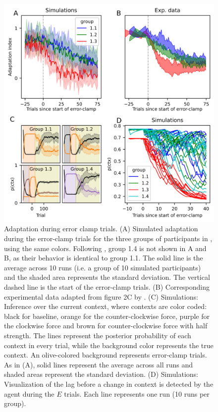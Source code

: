\documentclass[a4paper,doc,floatsintext,natbib]{apa6}
\begin{document}
\begin{figure}
\centering
\includegraphics[width=\textwidth]{./figures/figure_4.png}
\caption{Adaptation during error clamp trials. (A) Simulated adaptation during the error-clamp trials for the three groups of participants in \cite{Vaswani_Decay_2013}, using the same colors. Following \cite{Vaswani_Decay_2013}, group 1.4 is not shown in A and B, as their behavior is identical to group 1.1. The solid line is the average across 10 runs (i.e. a group of 10 simulated participants) and the shaded area represents the standard deviation. The vertical dashed line is the start of the error-clamp trials. (B) Corresponding experimental data adapted from figure 2C by \cite{Vaswani_Decay_2013}. (C) Simulations: Inference over the current context, where contexts are color coded: black for baseline, orange for the counter-clockwise force, purple for the clockwise force and brown for counter-clockwise force with half strength. The lines represent the posterior probability of each context in every trial, while the background color represents the true context. An olive-colored background represents error-clamp trials. As in (A), solid lines represent the average across all runs and shaded areas represent the standard deviation. (D) Simulations: Visualization of the lag before a change in context is detected by the agent during the $E$ trials. Each line represents one run (10 runs per group).}
\label{fig:vaswani-2013}
\end{figure}
\end{document}
